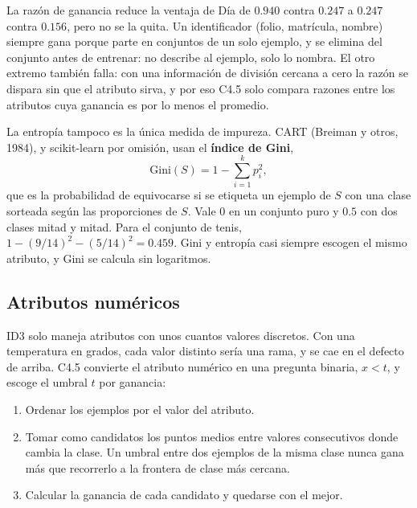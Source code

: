 \documentclass[11pt,letterpaper]{article}
\begin{document}
\begin{ojo}
    La razón de ganancia reduce la ventaja de Día de $0.940$ contra
    $0.247$ a $0.247$ contra $0.156$, pero no se la quita. Un
    identificador (folio, matrícula, nombre) siempre gana porque parte
    en conjuntos de un solo ejemplo, y se elimina del conjunto antes de
    entrenar: no describe al ejemplo, solo lo nombra. El otro extremo
    también falla: con una información de división cercana a cero la
    razón se dispara sin que el atributo sirva, y por eso C4.5 solo
    compara razones entre los atributos cuya ganancia es por lo menos
    el promedio.
\end{ojo}

La entropía tampoco es la única medida de impureza. CART (Breiman y
otros, 1984), y scikit-learn por omisión, usan el \textbf{índice de
Gini},
\[
    \text{Gini}(S) = 1 - \sum_{i=1}^{k} p_i^2 ,
\]
que es la probabilidad de equivocarse si se etiqueta un ejemplo de $S$
con una clase sorteada según las proporciones de $S$. Vale $0$ en un
conjunto puro y $0.5$ con dos clases mitad y mitad. Para el conjunto
de tenis, $1 - (9/14)^2 - (5/14)^2 = 0.459$. Gini y entropía casi
siempre escogen el mismo atributo, y Gini se calcula sin logaritmos.


\subsection*{Atributos numéricos}

ID3 solo maneja atributos con unos cuantos valores discretos. Con una
temperatura en grados, cada valor distinto sería una rama, y se cae en
el defecto de arriba. C4.5 convierte el atributo numérico en una
pregunta binaria, $x < t$, y escoge el umbral $t$ por ganancia:

\begin{enumerate}[itemsep=0.2em]
    \item Ordenar los ejemplos por el valor del atributo.
    \item Tomar como candidatos los puntos medios entre valores
          consecutivos donde cambia la clase. Un umbral entre dos
          ejemplos de la misma clase nunca gana más que recorrerlo a la
          frontera de clase más cercana.
    \item Calcular la ganancia de cada candidato y quedarse con el
          mejor.
\end{enumerate}
\end{document}
